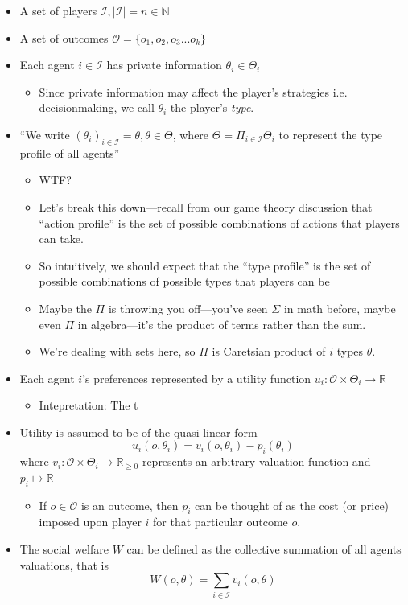 \documentclass[11pt]{article}
\begin{document}
\begin{itemize}
    \item A set of players $\mathcal{I}, |\mathcal{I}| = n \in \mathbb{N}$
    \item A set of outcomes $\mathcal{O} = \{o_1, o_2, o_3...o_k\}$
    \item Each agent $i \in \mathcal{I}$ has private information $\theta_i \in \Theta_i$
    \begin{itemize}
        \item Since private information may affect the player's strategies i.e. decisionmaking, we call $\theta_i$ the player's {\it type}.
    \end{itemize}
    \item ``We write $(\theta_i)_{i \in \mathcal{I}} = \theta, \theta \in \Theta$, where $\Theta = \Pi_{i\in \mathcal{I}}\Theta_i$ to represent the type profile of all agents''
    \begin{itemize}
        \item WTF?
        \item Let's break this down---recall from our game theory discussion that ``action profile'' is the set of possible combinations of actions that players can take.
        \item So intuitively, we should expect that the ``type profile'' is the set of possible combinations of possible types that players can be
        \item Maybe the $\Pi$ is throwing you off---you've seen $\Sigma$ in math before, maybe even $\Pi$ in algebra---it's the product of terms rather than the sum. 
        \item We're dealing with sets here, so $\Pi$ is Caretsian product of $i$ types $\theta$.
    \end{itemize}
    \item Each agent $i$'s preferences represented by a utility function $u_i : \mathcal{O} \times \Theta_i \rightarrow \mathbb{R}$
    \begin{itemize}
        \item Intepretation: The t
    \end{itemize}
    \item Utility is assumed to be of the quasi-linear form $$u_i(o, \theta_i) = v_i(o, \theta_i) - p_i(\theta_i)$$ where $v_i : \mathcal{O} \times \Theta_i \rightarrow \mathbb{R}_{\geq 0}$ represents an arbitrary valuation function and $p_i \mapsto \mathbb{R}$ 
    \begin{itemize}
        \item If $o \in \mathcal{O}$ is an outcome, then $p_i$ can be thought of as the cost (or price) imposed upon player $i$ for that particular outcome $o$. 
    \end{itemize}
    \item The social welfare $W$ can be defined as the collective summation of all agents valuations, that is \begin{equation}W(o, \theta) = \sum_{i \in \mathcal{I}} v_i(o, \theta)\end{equation}
\end{itemize}
\end{document}
